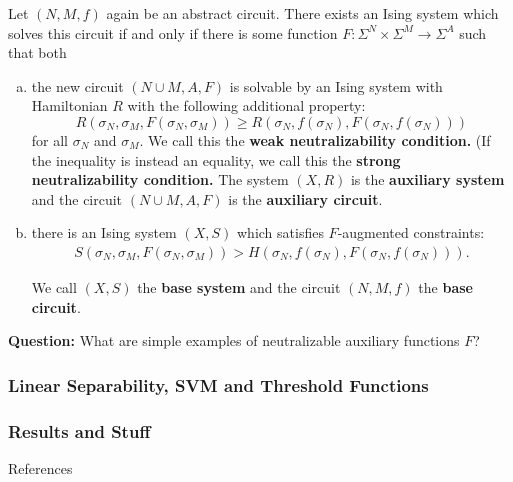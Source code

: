 \documentclass[8pt, mathserif, notheorems]{beamer}
\begin{document}
\begin{frame}[t]
  \begin{thm}\label{lem:augmented_constraints}
  Let $(N, M, f)$ again be an abstract circuit. There exists an Ising system which solves this circuit if and only if there is some function $F:\Sigma^N\times\Sigma^M \to \Sigma^A$ such that both
  \begin{enumerate}[(a)]
    \item the new circuit $(N\cup M, A, F)$ is solvable by an Ising system with Hamiltonian $R$ with the following additional property:
      \begin{equation}\label{eqn:weak-neutralizability}\tag{$\dagger$}
        R(\sigma_N, \sigma_M, F(\sigma_N,\sigma_M)) \geq R(\sigma_N, f(\sigma_N), F(\sigma_N, f(\sigma_N)))
      \end{equation}
      for all $\sigma_N$ and $\sigma_M$. We call this the \textbf{weak neutralizability condition.} (If the inequality is instead an equality, we call this the \textbf{strong neutralizability condition.} The system $(X, R)$ is the \textbf{auxiliary system} and the circuit $(N\cup M, A, F)$ is the \textbf{auxiliary circuit}.
    \item there is an Ising system $(X, S)$ which satisfies $F$-augmented constraints: 
      \begin{align*}
        S(\sigma_N, \sigma_M, F(\sigma_N, \sigma_M)) > H(\sigma_N, f(\sigma_N), F(\sigma_N, f(\sigma_N))).
      \end{align*}

      We call $(X,S)$ the \textbf{base system} and the circuit $(N,M,f)$ the \textbf{base circuit}.
  \end{enumerate} 
\end{thm}

\bigskip

\textbf{Question:} What are simple examples of neutralizable auxiliary functions $F$?
\end{frame}
\begin{frame}\frametitle{Linear Separability, SVM and Threshold Functions}
  
\end{frame}
\begin{frame}\frametitle{Results and Stuff}
  
\end{frame}
\begin{frame}[t]{References}

\nocite{*}
\printbibliography
\end{frame}
\end{document}
